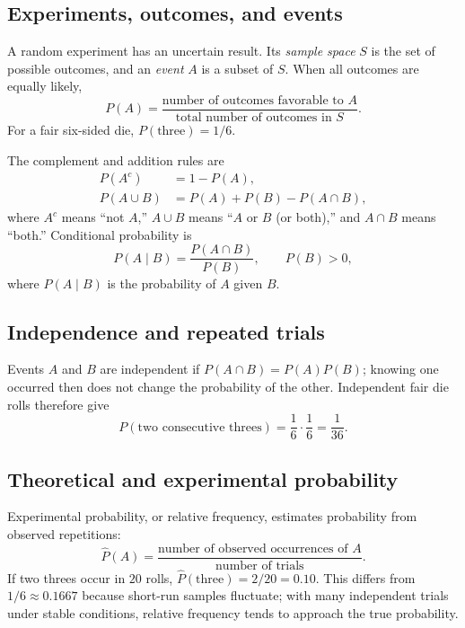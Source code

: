 \documentclass[11pt]{article}
\begin{document}
\subsection{Experiments, outcomes, and events}
A random experiment has an uncertain result.  Its \emph{sample space} $S$ is
the set of possible outcomes, and an \emph{event} $A$ is a subset of $S$.
When all outcomes are equally likely,
\begin{equation}\label{eq:classical-prob}
 P(A)=\frac{\text{number of outcomes favorable to }A}
 {\text{total number of outcomes in }S}.
\end{equation}
For a fair six-sided die, $P(\text{three})=1/6$.

The complement and addition rules are
\begin{align}
P(A^c)&=1-P(A),\\
P(A\cup B)&=P(A)+P(B)-P(A\cap B),
\end{align}
where $A^c$ means ``not $A$,'' $A\cup B$ means ``$A$ or $B$ (or both),''
and $A\cap B$ means ``both.''  Conditional probability is
\begin{equation}
P(A\mid B)=\frac{P(A\cap B)}{P(B)},\qquad P(B)>0,
\end{equation}
where $P(A\mid B)$ is the probability of $A$ given $B$.

\subsection{Independence and repeated trials}
Events $A$ and $B$ are independent if $P(A\cap B)=P(A)P(B)$; knowing one
occurred then does not change the probability of the other.  Independent
fair die rolls therefore give
\[
P(\text{two consecutive threes})=\frac16\cdot\frac16=\frac1{36}.
\]

\subsection{Theoretical and experimental probability}
Experimental probability, or relative frequency, estimates probability from
observed repetitions:
\begin{equation}\label{eq:empirical-prob}
 \widehat{P}(A)=\frac{\text{number of observed occurrences of }A}
 {\text{number of trials}}.
\end{equation}
If two threes occur in $20$ rolls, $\widehat P(\text{three})=2/20=0.10$.
This differs from $1/6\approx0.1667$ because short-run samples fluctuate; with
many independent trials under stable conditions, relative frequency tends to
approach the true probability.
\end{document}
